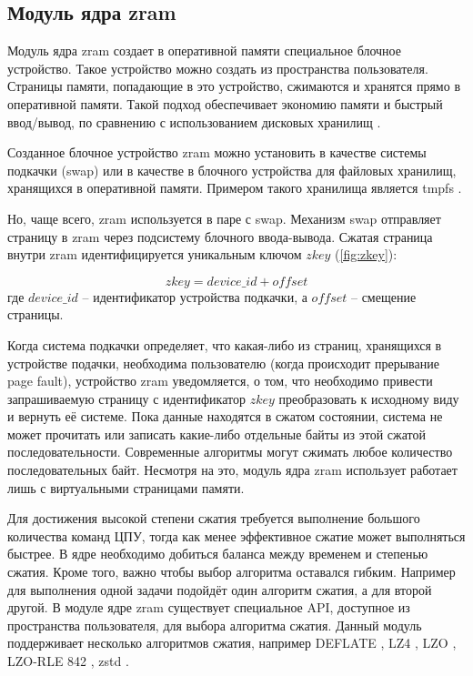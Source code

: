 \subsection{Модуль ядра zram}

Модуль ядра zram создает в оперативной памяти специальное блочное устройство. Такое устройство можно создать из пространства пользователя. Страницы памяти, попадающие в это устройство, сжимаются и хранятся прямо в оперативной памяти. Такой подход обеспечивает экономию памяти и быстрый ввод/вывод, по сравнению с использованием дисковых хранилищ \cite{zram}. 

Созданное блочное устройство zram можно установить в качестве системы подкачки (swap) или в качестве в блочного устройства для файловых хранилищ, хранящихся в оперативной памяти. Примером такого хранилища  является tmpfs \cite{tmpfs}. 

Но, чаще всего, zram используется в паре с swap. Механизм swap отправляет страницу в zram через подсистему блочного ввода-вывода. Сжатая страница внутри zram идентифицируется уникальным ключом $zkey$ (\ref{fig:zkey}):

\begin{equation}\label{fig:zkey}
	zkey = device\_id + offset
\end{equation}
где $device\_id$ -- идентификатор устройства подкачки, а $offset$ -- смещение страницы.

Когда система подкачки определяет, что какая-либо из страниц, хранящихся в устройстве подачки, необходима пользователю (когда происходит прерывание page fault), устройство zram уведомляется, о том, что необходимо привести запрашиваемую страницу с идентификатор $zkey$ преобразовать к исходному виду и вернуть её системе. Пока данные находятся в сжатом состоянии, система не может прочитать или записать какие-либо отдельные байты из этой сжатой последовательности. Современные алгоритмы могут сжимать любое количество последовательных байт. Несмотря на это, модуль ядра zram использует работает лишь с виртуальными страницами памяти.

Для достижения высокой степени сжатия требуется выполнение большого количества команд ЦПУ, тогда как менее эффективное сжатие может выполняться быстрее. В ядре необходимо добиться баланса между временем и степенью сжатия. Кроме того, важно чтобы выбор алгоритма оставался гибким. Например для выполнения одной задачи подойдёт один алгоритм сжатия, а для второй другой. В модуле ядре zram существует специальное API, доступное из пространства пользователя, для выбора алгоритма сжатия. Данный модуль поддерживает несколько алгоритмов сжатия, например DEFLATE \cite{deflate}, LZ4 \cite{lz4}, LZO \cite{lzo}, LZO-RLE\cite{lzo-rle} 842 \cite{842}, zstd \cite{zstd}. 

